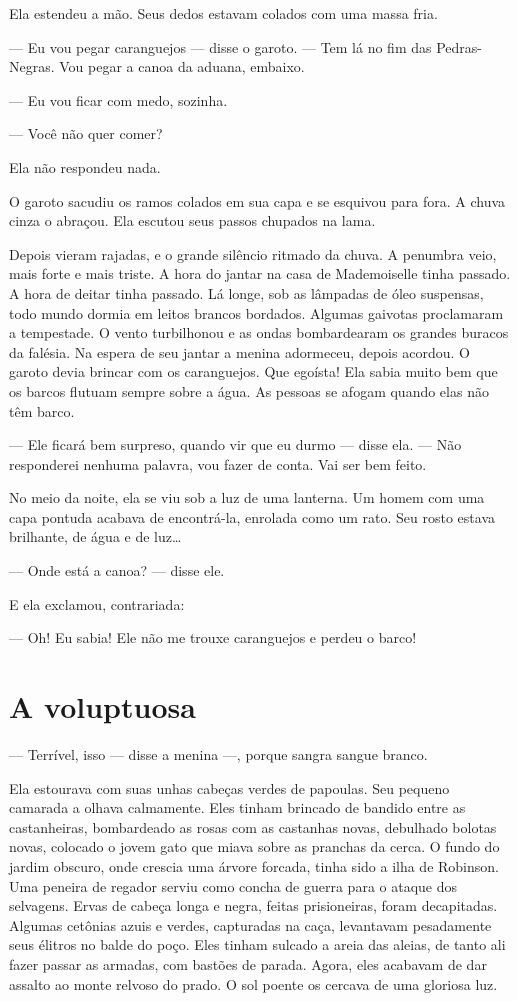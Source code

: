 Ela estendeu a mão. Seus dedos estavam colados com uma massa fria.

--- Eu vou pegar caranguejos --- disse o garoto. --- Tem lá no fim das
Pedras-Negras. Vou pegar a canoa da aduana, embaixo.

--- Eu vou ficar com medo, sozinha.

--- Você não quer comer?

Ela não respondeu nada.

O garoto sacudiu os ramos colados em sua capa e se esquivou para fora.
A chuva cinza o abraçou. Ela escutou seus passos chupados na lama.

Depois vieram rajadas, e o grande silêncio ritmado da chuva. A penumbra
veio, mais forte e mais triste. A hora do jantar na casa de Mademoiselle
tinha passado. A hora de deitar tinha passado. Lá longe, sob as lâmpadas
de óleo suspensas, todo mundo dormia em leitos brancos bordados. Algumas
gaivotas proclamaram a tempestade. O vento turbilhonou e as ondas
bombardearam os grandes buracos da falésia. Na espera de seu jantar a
menina adormeceu, depois acordou. O garoto devia brincar com os
caranguejos. Que egoísta! Ela sabia muito bem que os barcos flutuam
sempre sobre a água. As pessoas se afogam quando elas não têm barco.

--- Ele ficará bem surpreso, quando vir que eu durmo --- disse ela. --- Não
responderei nenhuma palavra, vou fazer de conta. Vai ser bem feito.

No meio da noite, ela se viu sob a luz de uma lanterna. Um homem com
uma capa pontuda acabava de encontrá-la, enrolada como um rato. Seu rosto
estava brilhante, de água e de luz\ldots{}

--- Onde está a canoa? --- disse ele.

E ela exclamou, contrariada:

--- Oh! Eu sabia! Ele não me trouxe caranguejos e perdeu o barco!

\section*{A voluptuosa}

--- Terrível, isso --- disse a menina ---, porque sangra sangue branco.

Ela estourava com suas unhas cabeças verdes de papoulas. Seu pequeno
camarada a olhava calmamente. Eles tinham brincado de bandido entre as
castanheiras, bombardeado as rosas com as castanhas novas, debulhado
bolotas novas, colocado o jovem gato que miava sobre as pranchas da cerca.
O fundo do jardim obscuro, onde crescia uma árvore forcada, tinha sido a
ilha de Robinson. Uma peneira de regador serviu como concha de guerra para
o ataque dos selvagens. Ervas de cabeça longa e negra, feitas
prisioneiras, foram decapitadas. Algumas cetônias azuis e verdes,
capturadas na caça, levantavam pesadamente seus élitros no balde do poço.
Eles tinham sulcado a areia das aleias, de tanto ali fazer passar as
armadas, com bastões de parada. Agora, eles acabavam de dar assalto ao
monte relvoso do prado. O sol poente os cercava de uma gloriosa luz.

